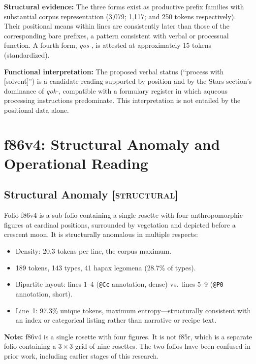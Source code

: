 \documentclass[11pt,a4paper]{article}
\newcommand{\structural}{\textsc{[structural]}}
\begin{document}
\textbf{Structural evidence:} The three forms exist as productive prefix families with substantial corpus representation (3,079; 1,117; and 250 tokens respectively). Their positional means within lines are consistently later than those of the corresponding bare prefixes, a pattern consistent with verbal or processual function. A fourth form, \textit{qos-}, is attested at approximately 15 tokens (standardized).

\textbf{Functional interpretation:} The proposed verbal status (``process with [solvent]'') is a candidate reading supported by position and by the Stars section's dominance of \textit{qok-}, compatible with a formulary register in which aqueous processing instructions predominate. This interpretation is not entailed by the positional data alone.

\section{f86v4: Structural Anomaly and Operational Reading}

\subsection{Structural Anomaly \structural{}}

Folio f86v4 is a sub-folio containing a single rosette with four anthropomorphic figures at cardinal positions, surrounded by vegetation and depicted before a crescent moon. It is structurally anomalous in multiple respects:

\begin{itemize}[leftmargin=2em]
\item Density: 20.3 tokens per line, the corpus maximum.
\item 189 tokens, 143 types, 41 hapax legomena (28.7\% of types).
\item Bipartite layout: lines 1--4 (\texttt{@Cc} annotation, dense) vs.\ lines 5--9 (\texttt{@P0} annotation, short).
\item Line~1: 97.3\% unique tokens, maximum entropy---structurally consistent with an index or categorical listing rather than narrative or recipe text.
\end{itemize}

\textbf{Note:} f86v4 is a single rosette with four figures. It is not f85r, which is a separate folio containing a $3 \times 3$ grid of nine rosettes. The two folios have been confused in prior work, including earlier stages of this research.
\end{document}
